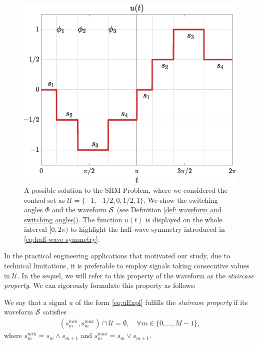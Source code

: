 \documentclass[twocolumn]{autart}    %
\begin{document}
\begin{figure}[h]
	\centering
	\includegraphics[scale=0.35]{img/fig01.eps} 
	\caption{A possible solution to the SHM Problem, where we considered the control-set as $\mathcal{U} = \{-1, -1/2, 0, 1/2, 1\}$. We show the switching angles $\Phi$ and the waveform $\mathcal{S}$ (see Definition \ref{def: waveform and switching angles}). The function $u(t)$ is displayed on the whole interval $[0,2\pi)$ to highlight the half-wave symmetry introduced in \eqref{eq:half-wave symmetry}.}
	\label{fig:exampleSHE}
\end{figure}

In the practical engineering applications that motivated our study, due to technical limitations, it is preferable to employ signals taking consecutive values in $\mathcal{U}$. In the sequel, we will refer to this property of the waveform as the \emph{staircase property}. We can rigorously formulate this property as follows: 

\begin{definition}\label{def:staircase prop}
We say that a signal $u$ of the form \eqref{eq:uExpl} fulfills the \emph{staircase property} if its waveform $\mathcal{S}$ satisfies
\begin{gather}\label{eq:staircase prop}
	(s_m^{min},s_{m}^{max}) \cap \mathcal{U} = \emptyset, \quad \forall m\in \{ 0, \ldots, M-1 \},
\end{gather}
where $s^{min}_m = s_m\wedge s_{m+1}$ and $s^{max}_m = s_m \vee s_{m+1}.$
\end{definition}
\end{document}
